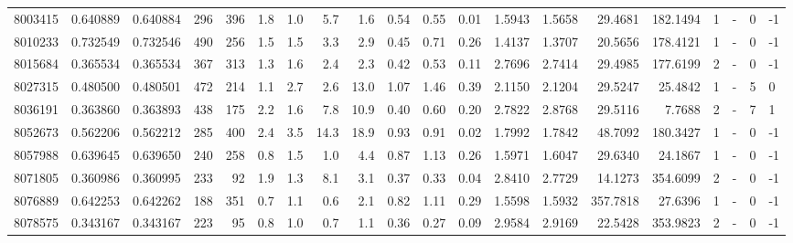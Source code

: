 \begin{tabular}{rrrrrrrrrrrrrrrrrlrl}
   8003415 & 0.640889 &   0.640884 &  296 &  396 &      1.8 &      1.0 &     5.7 &      1.6 &       0.54 &        0.55 &        0.01 &  1.5943 &  1.5658 &   29.4681 &  182.1494 &       1 &             - &        0 &        -1 \\
   8010233 & 0.732549 &   0.732546 &  490 &  256 &      1.5 &      1.5 &     3.3 &      2.9 &       0.45 &        0.71 &        0.26 &  1.4137 &  1.3707 &   20.5656 &  178.4121 &       1 &             - &        0 &        -1 \\
   8015684 & 0.365534 &   0.365534 &  367 &  313 &      1.3 &      1.6 &     2.4 &      2.3 &       0.42 &        0.53 &        0.11 &  2.7696 &  2.7414 &   29.4985 &  177.6199 &       2 &             - &        0 &        -1 \\
   8027315 & 0.480500 &   0.480501 &  472 &  214 &      1.1 &      2.7 &     2.6 &     13.0 &       1.07 &        1.46 &        0.39 &  2.1150 &  2.1204 &   29.5247 &   25.4842 &       1 &             - &        5 &         0 \\
   8036191 & 0.363860 &   0.363893 &  438 &  175 &      2.2 &      1.6 &     7.8 &     10.9 &       0.40 &        0.60 &        0.20 &  2.7822 &  2.8768 &   29.5116 &    7.7688 &       2 &             - &        7 &         1 \\
   8052673 & 0.562206 &   0.562212 &  285 &  400 &      2.4 &      3.5 &    14.3 &     18.9 &       0.93 &        0.91 &        0.02 &  1.7992 &  1.7842 &   48.7092 &  180.3427 &       1 &             - &        0 &        -1 \\
   8057988 & 0.639645 &   0.639650 &  240 &  258 &      0.8 &      1.5 &     1.0 &      4.4 &       0.87 &        1.13 &        0.26 &  1.5971 &  1.6047 &   29.6340 &   24.1867 &       1 &             - &        0 &        -1 \\
   8071805 & 0.360986 &   0.360995 &  233 &   92 &      1.9 &      1.3 &     8.1 &      3.1 &       0.37 &        0.33 &        0.04 &  2.8410 &  2.7729 &   14.1273 &  354.6099 &       2 &             - &        0 &        -1 \\
   8076889 & 0.642253 &   0.642262 &  188 &  351 &      0.7 &      1.1 &     0.6 &      2.1 &       0.82 &        1.11 &        0.29 &  1.5598 &  1.5932 &  357.7818 &   27.6396 &       1 &             - &        0 &        -1 \\
   8078575 & 0.343167 &   0.343167 &  223 &   95 &      0.8 &      1.0 &     0.7 &      1.1 &       0.36 &        0.27 &        0.09 &  2.9584 &  2.9169 &   22.5428 &  353.9823 &       2 &             - &        0 &        -1 \\

\end{tabular}
